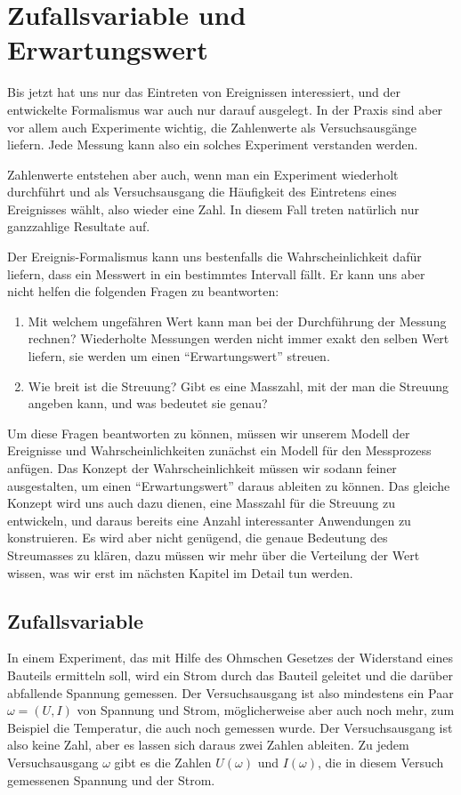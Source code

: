 %
%
%
\chapter{Zufallsvariable und Erwartungswert} \label{chapter-erwartungswert-und-varianz}

Bis jetzt hat uns nur das Eintreten von Ereignissen interessiert, und
der entwickelte Formalismus war auch nur darauf ausgelegt.
In der Praxis sind aber vor allem auch Experimente wichtig, die
Zahlenwerte als Versuchsausgänge liefern.
Jede Messung kann also ein solches Experiment verstanden werden.

Zahlenwerte entstehen aber auch, wenn man ein Experiment wiederholt
durchführt und als Versuchsausgang die Häufigkeit des Eintretens
eines Ereignisses wählt, also wieder eine Zahl.
In diesem Fall treten natürlich nur ganzzahlige Resultate auf.

Der Ereignis-Formalismus kann uns bestenfalls die Wahrscheinlichkeit
dafür liefern, dass ein Messwert in ein bestimmtes Intervall fällt.
Er kann uns aber nicht helfen die folgenden Fragen zu beantworten:
\begin{enumerate}
\item Mit welchem ungefähren Wert kann man bei der Durchführung der
Messung rechnen?
Wiederholte Messungen werden nicht immer exakt den selben Wert liefern,
sie werden um einen ``Erwartungswert'' streuen.
\item Wie breit ist die Streuung? Gibt es eine Masszahl, mit der man
die Streuung angeben kann, und was bedeutet sie genau?
\end{enumerate}
Um diese Fragen beantworten zu können, müssen wir unserem Modell
der Ereignisse und Wahrscheinlichkeiten zunächst 
ein Modell für den Messprozess anfügen.
Das Konzept der Wahrscheinlichkeit müssen wir sodann feiner ausgestalten,
um einen ``Erwartungswert'' daraus ableiten zu können.
Das gleiche Konzept wird uns auch dazu dienen, eine Masszahl für
die Streuung zu entwickeln, und daraus bereits eine Anzahl interessanter
Anwendungen zu konstruieren.
Es wird aber nicht genügend, die genaue Bedeutung des Streumasses
zu klären, dazu müssen wir mehr über die Verteilung der Wert wissen,
was wir erst im nächsten Kapitel im Detail tun werden.

\section{Zufallsvariable}
In einem Experiment, das mit Hilfe des Ohmschen Gesetzes der Widerstand eines
Bauteils ermitteln soll, wird ein Strom durch das Bauteil geleitet und die
darüber abfallende Spannung gemessen.
Der Versuchsausgang ist also mindestens ein Paar $\omega=(U,I)$ von Spannung und
Strom, möglicherweise aber auch noch mehr, zum Beispiel die Temperatur, die
auch noch gemessen wurde.
Der Versuchsausgang ist also keine Zahl, aber es lassen sich daraus zwei
Zahlen ableiten.
Zu jedem Versuchsausgang $\omega$ gibt es die Zahlen $U(\omega)$
und $I(\omega)$, die in diesem Versuch gemessenen Spannung und der Strom.


